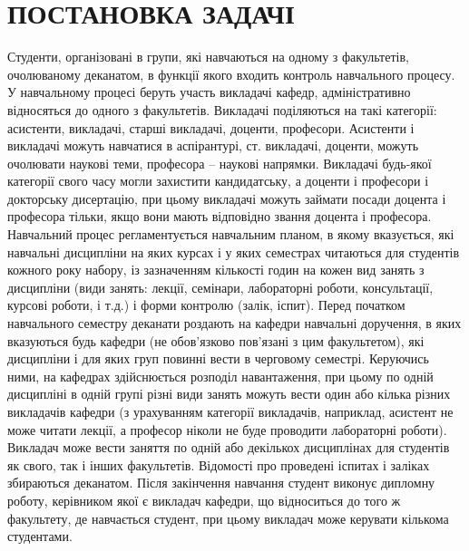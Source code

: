 \newpage
\chapter{ПОСТАНОВКА ЗАДАЧІ}
Студенти, організовані в групи, які навчаються на одному з 
факультетів, очолюваному деканатом, в функції якого входить 
контроль навчального процесу. У навчальному процесі беруть 
участь викладачі кафедр, адміністративно відносяться до одного 
з факультетів. Викладачі поділяються на такі категорії: асистенти, 
викладачі, старші викладачі, доценти, професори. Асистенти і 
викладачі можуть навчатися в аспірантурі, ст. викладачі, доценти, 
можуть очолювати наукові теми, професора -- наукові напрямки. 
Викладачі будь-якої категорії свого часу могли захистити 
кандидатську, а доценти і професори і докторську дисертацію, 
при цьому викладачі можуть займати посади доцента і професора 
тільки, якщо вони мають відповідно звання доцента і професора.
Навчальний процес регламентується навчальним планом, в якому 
вказується, які навчальні дисципліни на яких курсах і у яких 
семестрах читаються для студентів кожного року набору, із 
зазначенням кількості годин на кожен вид занять з дисципліни 
(види занять: лекції, семінари, лабораторні роботи, консультації, 
курсові роботи, і т.д.) і форми контролю (залік, іспит). 
Перед початком навчального семестру деканати роздають на кафедри 
навчальні доручення, в яких вказуються будь кафедри (не обов'язково
пов'язані з цим факультетом), які дисципліни і для яких груп
повинні вести в черговому семестрі. Керуючись ними, на кафедрах 
здійснюється розподіл навантаження, при цьому по одній дисципліні 
в одній групі різні види занять можуть вести один або кілька різних
викладачів кафедри (з урахуванням категорії викладачів, наприклад, 
асистент не може читати лекції, а професор ніколи не буде проводити
лабораторні роботи). Викладач може вести заняття по одній або декількох
дисциплінах для студентів як свого, так і інших факультетів. Відомості
про проведені іспитах і заліках збираються деканатом.
Після закінчення навчання студент виконує дипломну роботу, 
керівником якої є викладач кафедри, що відноситься до того 
ж факультету, де навчається студент, при цьому викладач може 
керувати кількома студентами. 

